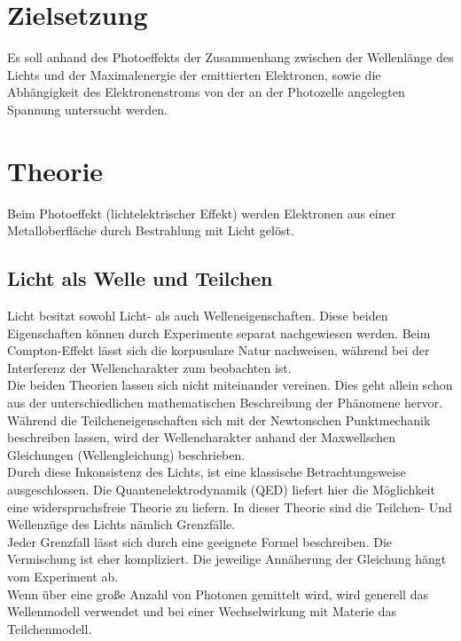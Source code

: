 \section{Zielsetzung}
\label{sec:Zielsetzung}

Es soll anhand des Photoeffekts der Zusammenhang zwischen der Wellenlänge des Lichts und der Maximalenergie
der emittierten Elektronen, sowie die Abhängigkeit des Elektronenstroms von der an der Photozelle angelegten
Spannung untersucht werden.

\section{Theorie}
\label{sec:Theorie}

Beim Photoeffekt (lichtelektrischer Effekt) werden Elektronen
aus einer Metalloberfläche durch Bestrahlung mit Licht gelöst.

\subsection{Licht als Welle und Teilchen}

Licht besitzt sowohl Licht- als auch Welleneigenschaften. Diese
beiden Eigenschaften können durch Experimente separat nachgewiesen
werden. Beim Compton-Effekt lässt sich die korpusulare Natur
nachweisen, während bei der Interferenz der Wellencharakter zum
beobachten ist.\\
Die beiden Theorien lassen sich nicht miteinander vereinen. Dies geht 
allein schon aus der unterschiedlichen mathematischen Beschreibung
der Phänomene hervor. Während die Teilcheneigenschaften sich
mit der Newtonschen Punktmechanik beschreiben lassen, wird der
Wellencharakter anhand der Maxwellschen Gleichungen (Wellengleichung)
beschrieben.\\
Durch diese Inkonsistenz des Lichts, ist eine klassische 
Betrachtungsweise ausgeschlossen. Die Quantenelektrodynamik (QED)
liefert hier die Möglichkeit eine widerspruchsfreie Theorie
zu liefern. In dieser Theorie sind die Teilchen- Und Wellenzüge
des Lichts nämlich Grenzfälle.\\
Jeder Grenzfall lässt sich durch eine geeignete Formel beschreiben.
Die Vermischung ist eher kompliziert. Die jeweilige Annäherung
der Gleichung hängt vom Experiment ab.\\
Wenn über eine große Anzahl von Photonen gemittelt wird, wird
generell das Wellenmodell verwendet und bei einer Wechselwirkung
mit Materie das Teilchenmodell. \\


